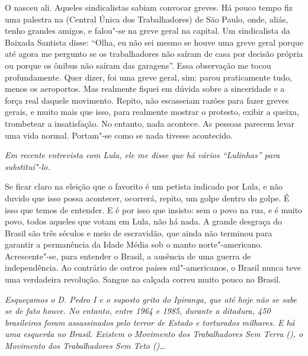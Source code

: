 \normalfont
O  nasceu ali. Aqueles sindicalistas sabiam convocar
greves. Há pouco tempo fiz uma palestra na  (Central Única dos
Trabalhadores) de São Paulo, onde, aliás, tenho grandes amigos, e
falou"-se na greve geral na capital. Um sindicalista da Baixada Santista
disse: ``Olha, eu não sei mesmo se houve uma greve geral porque até
agora me pergunto se os trabalhadores não saíram de casa por decisão
própria ou porque os ônibus não saíram das garagens''. Essa observação
me tocou profundamente. Quer dizer, foi uma greve geral, sim: parou
praticamente tudo, menos os aeroportos. Mas realmente fiquei em dúvida
sobre a sinceridade e a força real daquele movimento. Repito, não
escasseiam razões para fazer greves gerais, e muito mais que isso, para
realmente mostrar o protesto, exibir a queixa, trombetear a
insatisfação. No entanto, nada acontece. As pessoas parecem levar uma
vida normal. Portam"-se como se nada tivesse acontecido.

\itshape
 Em recente entrevista com Lula, ele me disse que há
vários ``Lulinhas'' para substituí"-lo.

\normalfont
Se ficar claro na eleição que o favorito é um petista
indicado por Lula, e não duvido que isso possa acontecer, ocorrerá,
repito, um golpe dentro do golpe. É isso que temos de entender. E é por
isso que insisto: sem o povo na rua, e é muito povo, todos aqueles que
votam em Lula, não há nada. A grande desgraça do Brasil são três séculos
e meio de escravidão, que ainda não terminou para garantir a permanência
da Idade Média sob o manto norte"-americano. Acrescente"-se, para entender
o Brasil, a ausência de uma guerra de independência. Ao contrário de
outros países sul"-americanos, o Brasil nunca teve uma verdadeira
revolução. Sangue na calçada correu muito pouco no Brasil.

\itshape
 Esqueçamos o D. Pedro I e o suposto grito do Ipiranga,
que até hoje não se sabe se de fato houve. No entanto, entre 1964 e
1985, durante a ditadura, 450 brasileiros foram assassinados pelo terror
de Estado e torturados milhares. E há uma esquerda no Brasil. Existem o
Movimento dos Trabalhadores Sem Terra (), o Movimento dos
Trabalhadores Sem Teto ()…

